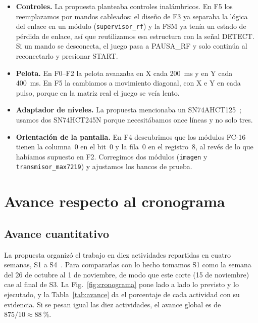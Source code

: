 \documentclass[conference,a4paper]{IEEEtran}
\begin{document}
\begin{itemize}
\item \textbf{Controles.} La propuesta planteaba controles inalámbricos. En F5 los reemplazamos por mandos cableados: el diseño de F3 ya separaba la lógica del enlace en un módulo (\texttt{supervisor\_rf}) y la FSM ya tenía un estado de pérdida de enlace, así que reutilizamos esa estructura con la señal DETECT. Si un mando se desconecta, el juego pasa a PAUSA\_RF y solo continúa al reconectarlo y presionar START.
\item \textbf{Pelota.} En F0--F2 la pelota avanzaba en X cada 200~ms y en Y cada 400~ms. En F5 la cambiamos a movimiento diagonal, con X e Y en cada pulso, porque en la matriz real el juego se veía lento.
\item \textbf{Adaptador de niveles.} La propuesta mencionaba un SN74AHCT125~\cite{propuesta}; usamos dos SN74HCT245N porque necesitábamos once líneas y no solo tres.
\item \textbf{Orientación de la pantalla.} En F4 descubrimos que los módulos FC-16 tienen la columna~0 en el bit~0 y la fila~0 en el registro~8, al revés de lo que habíamos supuesto en F2. Corregimos dos módulos (\texttt{imagen} y \texttt{transmisor\_max7219}) y ajustamos los bancos de prueba.
\end{itemize}

\section{Avance respecto al cronograma}

\subsection{Avance cuantitativo}

La propuesta organizó el trabajo en diez actividades repartidas en cuatro semanas, S1 a S4~\cite{propuesta}. Para compararlas con lo hecho tomamos S1 como la semana del 26 de octubre al 1 de noviembre, de modo que este corte (15 de noviembre) cae al final de S3. La Fig.~\ref{fig:cronograma} pone lado a lado lo previsto y lo ejecutado, y la Tabla~\ref{tab:avance} da el porcentaje de cada actividad con su evidencia. Si se pesan igual las diez actividades, el avance global es de $875/10 \approx 88~\%$.
\end{document}
